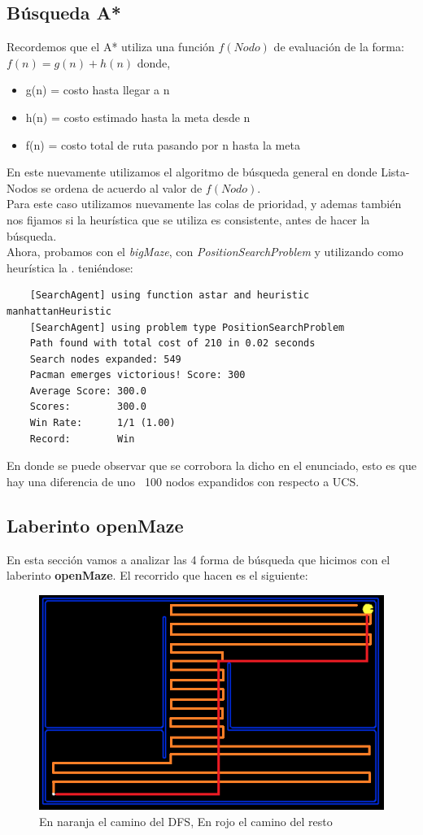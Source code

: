 \documentclass[12pt, titlepage, a4paper]{article}
\begin{document}
\subsection{Búsqueda A*}
Recordemos que el A* utiliza una función $f(Nodo)$ de 
evaluación de la forma: $f(n) = g(n) + h(n)$ donde,
\begin{itemize}
    \item {g(n) = costo hasta llegar a n}
    \item {h(n) = costo estimado hasta la meta desde n}
    \item {f(n) = costo total de ruta pasando por n hasta la meta}
\end{itemize}

En este nuevamente utilizamos el algoritmo 
de búsqueda general 
en donde Lista-Nodos se ordena de
acuerdo al valor de $f(Nodo)$.\\

Para este caso utilizamos nuevamente las colas de prioridad, y ademas también nos 
fijamos si la heurística que se utiliza es consistente, antes de hacer la búsqueda.\\

Ahora, probamos con el \textit{bigMaze}, con \textit{PositionSearchProblem} y
 utilizando como heurística la .
teniéndose: 
\begin{verbatim}
    [SearchAgent] using function astar and heuristic manhattanHeuristic
    [SearchAgent] using problem type PositionSearchProblem
    Path found with total cost of 210 in 0.02 seconds
    Search nodes expanded: 549
    Pacman emerges victorious! Score: 300
    Average Score: 300.0
    Scores:        300.0
    Win Rate:      1/1 (1.00)
    Record:        Win
\end{verbatim}

En donde se puede observar que se corrobora la dicho en el enunciado, esto 
es que hay una diferencia de uno ~100 nodos expandidos con respecto a UCS.

\subsection{Laberinto openMaze}
En esta sección vamos a analizar las 4 forma de búsqueda que hicimos con 
el laberinto \textbf{openMaze}. El recorrido que hacen es el siguiente:

\begin{figure}[H]
    \centering
    \includegraphics[width=.8\textwidth]{Imagenes/caminos.png}
    \caption{En naranja el camino del DFS, En rojo el camino del resto}
\end{figure}
\end{document}
